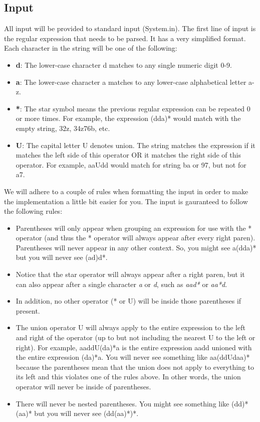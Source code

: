 \documentclass[11pt]{article}
\begin{document}
\subsection*{Input}

All input will be provided to standard input (System.in). The first line of input is the regular expression that needs to be parsed. It has a very simplified format. Each character in the string will be one of the following:

\begin{itemize}
	\item \textbf{d}: The lower-case character d matches to any single numeric digit 0-9.
	\item \textbf{a}: The lower-case character a matches to any lower-case alphabetical letter a-z.
	\item \textbf{*}: The star symbol means the previous regular expression can be repeated 0 or more times. For example, the expression (dda)* would match with the empty string, 32z, 34z76b, etc.
	\item \textbf{U}: The capital letter U denotes union. The string matches the expression if it matches the left side of this operator OR it matches the right side of this operator. For example, aaUdd would match for string ba or 97, but not for a7.
\end{itemize}

We will adhere to a couple of rules when formatting the input in order to make the implementation a little bit easier for you. The input is gauranteed to follow the following rules:

 \begin{itemize}
	\item Parentheses will only appear when grouping an expression for use with the * operator (and thus the * operator will always appear after every right paren). Parentheses will never appear in any other context. So, you might see a(dda)* but you will never see (ad)d*.
	\item Notice that the star operator will always appear after a right paren, but it can also appear after a single character \emph{a} or \emph{d}, such as \emph{aad*} or \emph{aa*d}.
	\item In addition, no other operator (* or U) will be inside those parentheses if present.
	\item The union operator U will always apply to the entire expression to the left and right of the operator (up to but not including the nearest U to the left or right). For example, aaddU(da)*a is the entire expression aadd unioned with the entire expression (da)*a. You will never see something like aa(ddUdaa)* because the parentheses mean that the union does not apply to everything to its left and this violates one of the rules above. In other words, the union operator will never be inside of parentheses.
	\item There will never be nested parentheses. You might see something like (dd)*(aa)* but you will never see (dd(aa)*)*.
\end{itemize}
\end{document}

